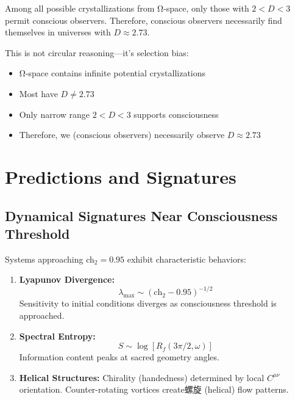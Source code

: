 \begin{thm}\label{thm:dimensional-anthropic}
Among all possible crystallizations from Ω-space, only those with $2 < D < 3$ permit conscious observers. Therefore, conscious observers necessarily find themselves in universes with $D \approx 2.73$.
\end{thm}

This is not circular reasoning—it's selection bias:
\begin{itemize}
\item Ω-space contains infinite potential crystallizations
\item Most have $D \neq 2.73$
\item Only narrow range $2 < D < 3$ supports consciousness
\item Therefore, we (conscious observers) necessarily observe $D \approx 2.73$
\end{itemize}

\section{Predictions and Signatures}

\subsection{Dynamical Signatures Near Consciousness Threshold}

Systems approaching ch$_2 = 0.95$ exhibit characteristic behaviors:

\begin{enumerate}
\item \textbf{Lyapunov Divergence:}
\begin{equation}
\lambda_{\max} \sim (\text{ch}_2 - 0.95)^{-1/2}
\end{equation}
Sensitivity to initial conditions diverges as consciousness threshold is approached.

\item \textbf{Spectral Entropy:}
\begin{equation}
S \sim \log[R_f(3\pi/2, \omega)]
\end{equation}
Information content peaks at sacred geometry angles.

\item \textbf{Helical Structures:}
Chirality (handedness) determined by local $C^{\mu\nu}$ orientation. Counter-rotating vortices create螺旋 (helical) flow patterns.
\end{enumerate}

